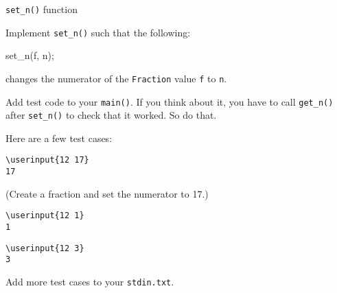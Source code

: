\verb!set_n()! function

Implement \verb!set_n()! such that the following:
\begin{console}
set_n(f, n);
\end{console}
changes the numerator of the \verb!Fraction! value \verb!f! to \verb!n!.

Add test code to your \verb!main()!. If you think about it, you have to call
\verb!get_n()! after \verb!set_n()! to check that it worked. So do that.

Here are a few test cases:

\resett
\nextt
\begin{Verbatim}[frame=single, commandchars=\\\{\}]
\userinput{12 17}
17
\end{Verbatim}
(Create a fraction and set the numerator to 17.)

\nextt
\begin{Verbatim}[frame=single, commandchars=\\\{\}]
\userinput{12 1}
1
\end{Verbatim}

\nextt
\begin{Verbatim}[frame=single, commandchars=\\\{\}]
\userinput{12 3}
3
\end{Verbatim}

Add more test cases to your \verb!stdin.txt!.
